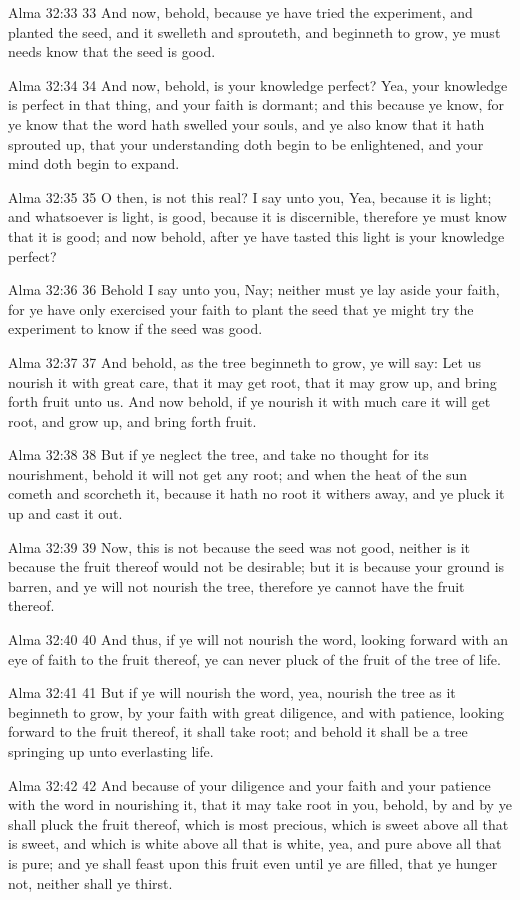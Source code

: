 Alma 32:33
 33 And now, behold, because ye have tried the experiment, and
planted the seed, and it swelleth and sprouteth, and beginneth to
grow, ye must needs know that the seed is good.

Alma 32:34
 34 And now, behold, is your knowledge perfect? Yea, your
knowledge is perfect in that thing, and your faith is dormant;
and this because ye know, for ye know that the word hath swelled
your souls, and ye also know that it hath sprouted up, that your
understanding doth begin to be enlightened, and your mind doth
begin to expand.

Alma 32:35
 35 O then, is not this real? I say unto you, Yea, because it is
light; and whatsoever is light, is good, because it is
discernible, therefore ye must know that it is good; and now
behold, after ye have tasted this light is your knowledge
perfect?

Alma 32:36
 36 Behold I say unto you, Nay; neither must ye lay aside your
faith, for ye have only exercised your faith to plant the seed
that ye might try the experiment to know if the seed was good.

Alma 32:37
 37 And behold, as the tree beginneth to grow, ye will say: Let
us nourish it with great care, that it may get root, that it may
grow up, and bring forth fruit unto us. And now behold, if ye
nourish it with much care it will get root, and grow up, and
bring forth fruit.

Alma 32:38
 38 But if ye neglect the tree, and take no thought for its
nourishment, behold it will not get any root; and when the heat
of the sun cometh and scorcheth it, because it hath no root it
withers away, and ye pluck it up and cast it out.

Alma 32:39
 39 Now, this is not because the seed was not good, neither is it
because the fruit thereof would not be desirable; but it is
because your ground is barren, and ye will not nourish the tree,
therefore ye cannot have the fruit thereof.

Alma 32:40
 40 And thus, if ye will not nourish the word, looking forward
with an eye of faith to the fruit thereof, ye can never pluck of
the fruit of the tree of life.

Alma 32:41
 41 But if ye will nourish the word, yea, nourish the tree as it
beginneth to grow, by your faith with great diligence, and with
patience, looking forward to the fruit thereof, it shall take
root; and behold it shall be a tree springing up unto everlasting
life.

Alma 32:42
 42 And because of your diligence and your faith and your
patience with the word in nourishing it, that it may take root in
you, behold, by and by ye shall pluck the fruit thereof, which is
most precious, which is sweet above all that is sweet, and which
is white above all that is white, yea, and pure above all that is
pure; and ye shall feast upon this fruit even until ye are
filled, that ye hunger not, neither shall ye thirst.

